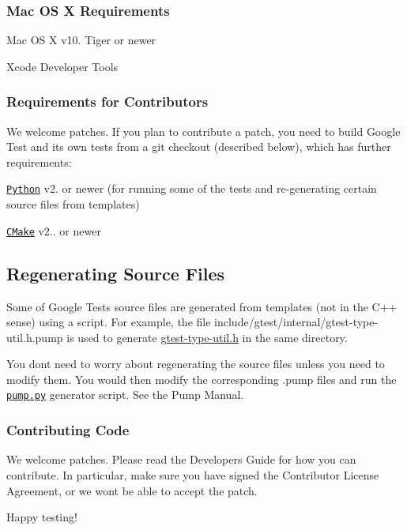 \subsubsection*{Mac OS X Requirements}


\begin{DoxyItemize}
\item Mac OS X v10. Tiger or newer
\item Xcode Developer Tools
\end{DoxyItemize}

\subsubsection*{Requirements for Contributors}

We welcome patches. If you plan to contribute a patch, you need to build Google Test and its own tests from a git checkout (described below), which has further requirements\+:


\begin{DoxyItemize}
\item \href{https://www.python.org/}{\tt Python} v2. or newer (for running some of the tests and re-\/generating certain source files from templates)
\item \href{https://cmake.org/}{\tt C\+Make} v2.. or newer
\end{DoxyItemize}

\subsection*{Regenerating Source Files}

Some of Google Test\textquotesingle{}s source files are generated from templates (not in the C++ sense) using a script. For example, the file include/gtest/internal/gtest-\/type-\/util.\+h.\+pump is used to generate \hyperlink{gtest-type-util_8h_source}{gtest-\/type-\/util.\+h} in the same directory.

You don\textquotesingle{}t need to worry about regenerating the source files unless you need to modify them. You would then modify the corresponding {\ttfamily .pump} files and run the \textquotesingle{}\href{googletest/scripts/pump.py}{\tt pump.\+py}\textquotesingle{} generator script. See the Pump Manual.

\subsubsection*{Contributing Code}

We welcome patches. Please read the Developer\textquotesingle{}s Guide for how you can contribute. In particular, make sure you have signed the Contributor License Agreement, or we won\textquotesingle{}t be able to accept the patch.

Happy testing! 